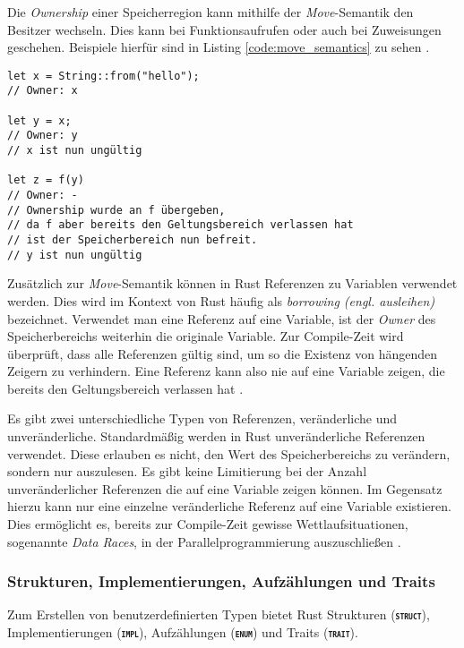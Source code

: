 Die \textit{Ownership} einer Speicherregion kann mithilfe der \textit{Move}-Semantik den Besitzer wechseln.
Dies kann bei Funktionsaufrufen oder auch bei Zuweisungen geschehen. Beispiele hierfür sind in Listing
\ref{code:move_semantics} zu sehen \cite{rustBook}.

\begin{lstlisting}[float,caption={Beispieldarstellung der \textit{Move}-Semantik},label=code:move_semantics]
let x = String::from("hello");
// Owner: x

let y = x;
// Owner: y
// x ist nun ungültig

let z = f(y) 
// Owner: -
// Ownership wurde an f übergeben,
// da f aber bereits den Geltungsbereich verlassen hat
// ist der Speicherbereich nun befreit.
// y ist nun ungültig
\end{lstlisting}

Zusätzlich zur \textit{Move}-Semantik können in Rust Referenzen zu Variablen verwendet werden. Dies wird im Kontext
von Rust häufig als \textit{borrowing (engl. ausleihen)} bezeichnet. Verwendet man eine Referenz auf eine Variable,
ist der \textit{Owner} des Speicherbereichs weiterhin die originale Variable.
Zur Compile-Zeit wird überprüft, dass alle Referenzen gültig sind, um so die Existenz von hängenden Zeigern
zu verhindern. Eine Referenz kann also nie auf eine Variable zeigen, die bereits den Geltungsbereich verlassen hat
\cite{rustBook}.

Es gibt zwei unterschiedliche
Typen von Referenzen, veränderliche und unveränderliche. Standardmäßig werden in Rust unveränderliche
Referenzen verwendet. Diese erlauben es nicht, den Wert des Speicherbereichs zu verändern, sondern nur auszulesen.
Es gibt keine Limitierung bei der Anzahl unveränderlicher Referenzen die auf eine Variable zeigen können.
Im Gegensatz
hierzu kann nur eine einzelne veränderliche Referenz auf eine Variable existieren. Dies ermöglicht es, bereits zur
Compile-Zeit gewisse Wettlaufsituationen, sogenannte \textit{Data Races},
in der Parallelprogrammierung auszuschließen \cite{rustBook}.

\subsubsection{Strukturen, Implementierungen, Aufzählungen und Traits}

Zum Erstellen von benutzerdefinierten Typen bietet Rust Strukturen (\texttt{\textsc{\textbf{struct}}}),
Implementierungen (\texttt{\textsc{\textbf{impl}}}), Aufzählungen (\texttt{\textsc{\textbf{enum}}}) und
Traits (\texttt{\textsc{\textbf{trait}}}).

